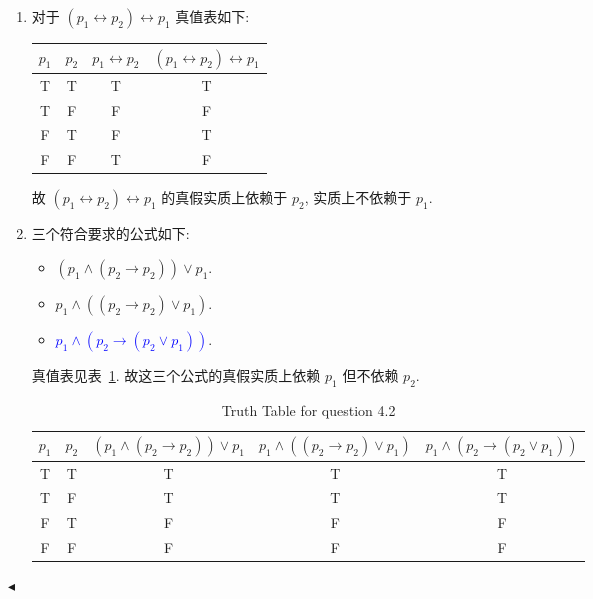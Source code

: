 \documentclass[11pt]{article}
\newenvironment{question}[2][Question]{\begin{trivlist}
    \item[\hskip \labelsep {\bfseries #1}\hskip \labelsep {\bfseries #2.}]\songti}{\hfill$\blacktriangleleft$\end{trivlist}}
\newcommand\1{\mathds{1}}
\begin{document}
\begin{question}{4 (15分)}
    \begin{enumerate}
        \item 对于 $(p_1 \leftrightarrow p_2) \leftrightarrow p_1$ 真值表如下:
        \begin{table}[htbp]
            \centering
            \begin{tabular}{cccc}
                \toprule
                $p_1$ & $p_2$ & $p_1 \leftrightarrow p_2$ & $(p_1 \leftrightarrow p_2) \leftrightarrow p_1$ \\
                \midrule
                T & T & T & T \\
                T & F & F & F \\
                F & T & F & T \\
                F & F & T & F \\
                \bottomrule
            \end{tabular}
        \end{table}

        故 $(p_1 \leftrightarrow p_2) \leftrightarrow p_1$ 的真假实质上依赖于 $p_2$, 实质上不依赖于 $p_1$.
        \item 三个符合要求的公式如下:
        \begin{itemize}
            \item $(p_1\land (p_2 \to p_2)) \lor p_1$.
            \item $p_1 \land ((p_2 \to p_2) \lor p_1)$.
            \item \textcolor{blue}{$p_1\land (p_2 \to (p_2 \lor p_1))$}.
        \end{itemize}

        真值表见表~\ref{tab:4.2}. 故这三个公式的真假实质上依赖 $p_1$ 但不依赖 $p_2$.
        \begin{table}[htbp]
            \centering
            \caption{Truth Table for question 4.2}
            \label{tab:4.2}
            \begin{tabular}{ccccc}
                \toprule
                $p_1$ & $p_2$ & $(p_1\land (p_2 \to p_2)) \lor p_1$ & $p_1 \land ((p_2 \to p_2) \lor p_1)$ & $p_1\land (p_2 \to (p_2 \lor p_1))$ \\
                \midrule
                T & T & T & T & T \\
                T & F & T & T & T \\
                F & T & F & F & F \\
                F & F & F & F & F \\
                \bottomrule
            \end{tabular}
        \end{table}


\end{enumerate}
\end{question}
\end{document}

